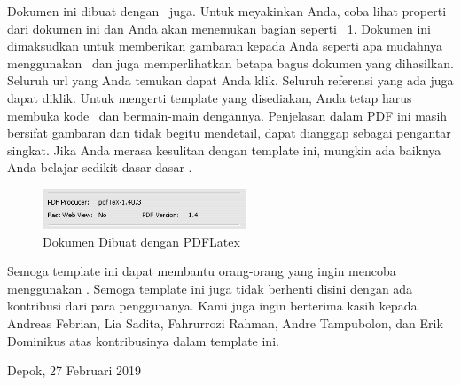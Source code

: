 Dokumen ini dibuat dengan \latex~juga. Untuk meyakinkan Anda, coba lihat 
properti dari dokumen ini dan Anda akan menemukan bagian seperti 
\pic~\ref{fig:pdflatex}. 
Dokumen ini dimaksudkan untuk memberikan gambaran kepada Anda seperti apa 
mudahnya menggunakan \latex~dan juga memperlihatkan betapa bagus dokumen 
yang dihasilkan. 
Seluruh url yang Anda temukan dapat Anda klik. 
Seluruh referensi yang ada juga dapat diklik. 
Untuk mengerti template yang disediakan, Anda tetap harus membuka kode 
\latex~dan bermain-main dengannya. 
Penjelasan dalam PDF ini masih bersifat gambaran dan tidak begitu 
mendetail, dapat dianggap sebagai pengantar singkat. 
Jika Anda merasa kesulitan dengan template ini, mungkin ada baiknya 
Anda belajar sedikit dasar-dasar \latex. 

\begin{figure}
	\centering
	\includegraphics[width=0.54\textwidth]
		{assets/pics/mark.png}
	\caption{Dokumen Dibuat dengan PDFLatex}
	\label{fig:pdflatex}
\end{figure}

Semoga template ini dapat membantu orang-orang yang ingin mencoba menggunakan 
\latex. Semoga template ini juga tidak berhenti disini dengan ada kontribusi 
dari para penggunanya. 
Kami juga ingin berterima kasih kepada Andreas Febrian, Lia Sadita, Fahrurrozi 
Rahman, Andre Tampubolon, dan Erik Dominikus atas kontribusinya dalam template 
ini. 

\vspace*{0.1cm}
\begin{flushright}
Depok, 27 Februari 2019\\[0.1cm]
\vspace*{1cm}
\penulis

\end{flushright}
\fi